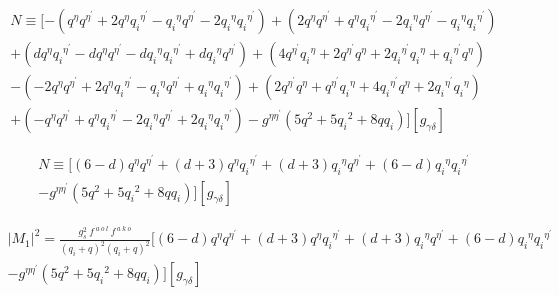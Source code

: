 \begin{equation}
\begin{split}
N\equiv [-({q}^{{\eta}}{q}^{{\eta}^{\prime}}+2{q}^{{\eta}}{q_i}^{{\eta}^{\prime}}-{q_i}^{{\eta}}{q}^{{\eta}^{\prime}}-2{q_i}^{{\eta}}{q_i}^{{\eta}^{\prime}})
+(2{q}^{{\eta}}{q}^{{\eta}^{\prime}}+{q}^{{\eta}}{q_i}^{{\eta}^{\prime}}-2{q_i}^{{\eta}}{q}^{{\eta}^{\prime}}-{q_i}^{{\eta}}{q_i}^{{\eta}^{\prime}})\\+(d{q}^{{\eta}}{q_i}^{{\eta}^{\prime}}-d{q}^{{\eta}}{q}^{{\eta}^{\prime}}-d{q_i}^{{\eta}}{q_i}^{{\eta}^{\prime}}+d{q_i}^{{\eta}}{q}^{{\eta}^{\prime}})+(4{q}^{{\eta}^{\prime}}{q_i}^{{\eta}}+2{q}^{{\eta}^{\prime}}{q}^{{\eta}}+2{q_i}^{{\eta}^{\prime}}{q_i}^{{\eta}}+{q_i}^{{\eta}^{\prime}}{q}^{{\eta}})\\
-(-2{q}^{{\eta}}{q}^{{\eta}^{\prime}}+2{q}^{{\eta}}{q_i}^{{\eta}^{\prime}}-{q_i}^{{\eta}}{q}^{{\eta}^{\prime}}+{q_i}^{{\eta}}{q_i}^{{\eta}^{\prime}})+(2{q}^{{\eta}^{\prime}}{q}^{{\eta}}+{q}^{{\eta}^{\prime}}{q_i}^{{\eta}}+4{q_i}^{{\eta}^{\prime}}{q}^{{\eta}}+2{q_i}^{{\eta}^{\prime}}{q_i}^{{\eta}})\\+(-{q}^{{\eta}}{q}^{{\eta}^{\prime}}+{q}^{{\eta}}{q_i}^{{\eta}^{\prime}}-2{q_i}^{{\eta}}{q}^{{\eta}^{\prime}}+2{q_i}^{{\eta}}{q_i}^{{\eta}^{\prime}})
-g^{{\eta}{{\eta}^{\prime}}}(5{q}^2+5{q_i}^2+8qq_i)][g_{{\gamma}{\delta}}]
\end{split}
\end{equation}

\begin{equation}
\begin{split}
N\equiv [(6-d){q}^{{\eta}}{q}^{{\eta}^{\prime}}+(d+3){q}^{{\eta}}{q_i}^{{\eta}^{\prime}}+(d+3){q_i}^{{\eta}}{q}^{{\eta}^{\prime}}+(6-d){q_i}^{{\eta}}{q_i}^{{\eta}^{\prime}}\\
-g^{{\eta}{{\eta}^{\prime}}}(5{q}^2+5{q_i}^2+8qq_i)][g_{{\gamma}{\delta}}]
\end{split}
\end{equation}

\begin{equation}
\begin{split}
|M_1|^2=\frac{g_s^2 \:f^{\:a\:o\:l}\: f^{\:a\:k\:o}}{(q_i +q)^2 (q_i +q)^2} [(6-d){q}^{{\eta}}{q}^{{\eta}^{\prime}}+(d+3){q}^{{\eta}}{q_i}^{{\eta}^{\prime}}+(d+3){q_i}^{{\eta}}{q}^{{\eta}^{\prime}}+(6-d){q_i}^{{\eta}}{q_i}^{{\eta}^{\prime}}\\
-g^{{\eta}{{\eta}^{\prime}}}(5{q}^2+5{q_i}^2+8qq_i)][g_{{\gamma}{\delta}}]
\end{split}
\end{equation}


